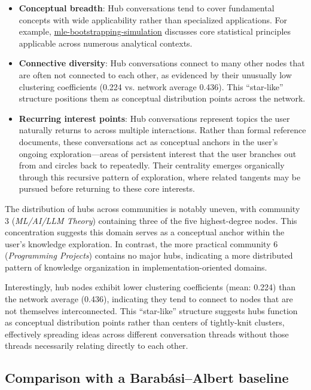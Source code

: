 \documentclass[10pt, a4paper]{article}
\begin{document}
\begin{itemize}
    \item \textbf{Conceptual breadth}: Hub conversations tend to cover fundamental concepts with wide applicability rather than specialized applications. For example, \url{mle-bootstrapping-simulation} discusses core statistical principles applicable across numerous analytical contexts.
    
    \item \textbf{Connective diversity}: Hub conversations connect to many other nodes that are often not connected to each other, as evidenced by their unusually low clustering coefficients (0.224 vs. network average 0.436). This ``star-like'' structure positions them as conceptual distribution points across the network.
    
    \item \textbf{Recurring interest points}: Hub conversations represent topics the user naturally returns to across multiple interactions. Rather than formal reference documents, these conversations act as conceptual anchors in the user's ongoing exploration---areas of persistent interest that the user branches out from and circles back to repeatedly. Their centrality emerges organically through this recursive pattern of exploration, where related tangents may be pursued before returning to these core interests.
\end{itemize}

The distribution of hubs across communities is notably uneven, with community 3 (\emph{ML/AI/LLM Theory}) containing three of the five highest-degree nodes. This concentration suggests this domain serves as a conceptual anchor within the user's knowledge exploration. In contrast, the more practical community 6 (\emph{Programming Projects}) contains no major hubs, indicating a more distributed pattern of knowledge organization in implementation-oriented domains.

Interestingly, hub nodes exhibit lower clustering coefficients (mean: 0.224) than the network average (0.436), indicating they tend to connect to nodes that are not themselves interconnected. This ``star-like'' structure suggests hubs function as conceptual distribution points rather than centers of tightly-knit clusters, effectively spreading ideas across different conversation threads without those threads necessarily relating directly to each other.

\subsection{Comparison with a Barabási--Albert baseline}
\label{sec:ba}
\end{document}

